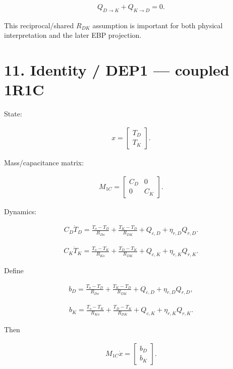 \documentclass[11pt]{article}
\begin{document}
\begin{align}
Q_{D\rightarrow K}+Q_{K\rightarrow D}=0.
\tag{28}
\end{align}

This reciprocal/shared \(R_{DK}\) assumption is important for both physical interpretation and the later EBP projection.

\section*{11. Identity / DEP1 --- coupled 1R1C}

State:

\begin{align}
\boxed{
x=
\begin{bmatrix}
T_D\\
T_K
\end{bmatrix}.
}
\end{align}

Mass/capacitance matrix:

\begin{align}
\boxed{
M_{1C}
=
\begin{bmatrix}
C_D&0\\
0&C_K
\end{bmatrix}.
}
\tag{29}
\end{align}

Dynamics:

\begin{align}
\boxed{
C_D\dot T_D
=
\frac{T_o-T_D}{R_{Do}}
+
\frac{T_K-T_D}{R_{DK}}
+
Q_{c,D}
+
\eta_{r,D}Q_{r,D}.
}
\tag{30}
\end{align}

\begin{align}
\boxed{
C_K\dot T_K
=
\frac{T_o-T_K}{R_{Ko}}
+
\frac{T_D-T_K}{R_{DK}}
+
Q_{c,K}
+
\eta_{r,K}Q_{r,K}.
}
\tag{31}
\end{align}

Define

\begin{align}
b_D=
\frac{T_o-T_D}{R_{Do}}
+
\frac{T_K-T_D}{R_{DK}}
+
Q_{c,D}
+
\eta_{r,D}Q_{r,D},
\tag{32}
\end{align}

\begin{align}
b_K=
\frac{T_o-T_K}{R_{Ko}}
+
\frac{T_D-T_K}{R_{DK}}
+
Q_{c,K}
+
\eta_{r,K}Q_{r,K}.
\tag{33}
\end{align}

Then

\begin{align}
\boxed{
M_{1C}\dot x=
\begin{bmatrix}
b_D\\b_K
\end{bmatrix}.
}
\tag{34}
\end{align}
\end{document}
